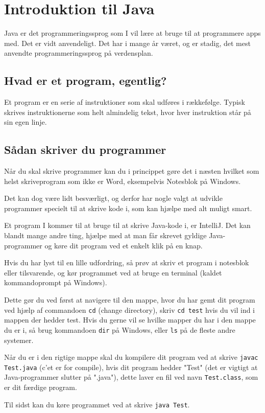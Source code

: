 \chapter{Introduktion til Java}
Java er det programmeringssprog som I vil lære at bruge til at programmere apps med. Det er vidt anvendeligt. Det har i mange år været, og er stadig, det mest anvendte programmeringssprog på verdensplan.

\section{Hvad er et program, egentlig?}
Et program er en serie af instruktioner som skal udføres i rækkefølge. Typisk skrives instruktionerne som helt almindelig tekst, hvor hver instruktion står på sin egen linje.

\section{Sådan skriver du programmer}
Når du skal skrive programmer kan du i princippet gøre det i næsten hvilket som helst skriveprogram som ikke er Word, eksempelvis Notesblok på Windows. 

Det kan dog være lidt besværligt, og derfor har nogle valgt at udvikle programmer specielt til at skrive kode i, som kan hjælpe med alt muligt smart. 

Et program I kommer til at bruge til at skrive Java-kode i, er IntelliJ. Det kan blandt mange andre ting, hjælpe med at man får skrevet gyldige Java-programmer og køre dit program ved et enkelt klik på en knap.

\begin{remark}
	Hvis du har lyst til en lille udfordring, så prøv at skriv et program i notesblok eller tilsvarende, og kør programmet ved at bruge en terminal (kaldet kommandoprompt på Windows). 
	
	Dette gør du ved først at navigere til den mappe, hvor du har gemt dit program ved hjælp af commandoen \texttt{cd} (change directory), skriv \texttt{cd test} hvis du vil ind i mappen der hedder test. Hvis du gerne vil se hvilke mapper du har i den mappe du er i, så brug kommandoen \texttt{dir} på Windows, eller \texttt{ls} på de fleste andre systemer. 
	
	Når du er i den rigtige mappe skal du kompilere dit program ved at skrive \texttt{javac Test.java} (c'et er for compile), hvis dit program hedder "Test" (det er vigtigt at Java-programmer slutter på ".java"), dette laver en fil ved navn \texttt{Test.class}, som er dit færdige program. 
	
	Til sidst kan du køre programmet ved at skrive \texttt{java Test}.
\end{remark}


